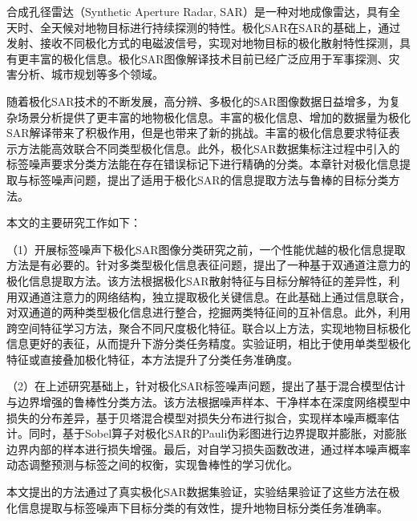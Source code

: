 \begin{chineseabstract}
    合成孔径雷达（Synthetic Aperture Radar, SAR）是一种对地成像雷达，具有全天时、全天候对地物目标进行持续探测的特性。极化SAR在SAR的基础上，通过发射、接收不同极化方式的电磁波信号，实现对地物目标的极化散射特性探测，具有更丰富的极化信息。极化SAR图像解译技术目前已经广泛应用于军事探测、灾害分析、城市规划等多个领域。

    随着极化SAR技术的不断发展，高分辨、多极化的SAR图像数据日益增多，为复杂场景分析提供了更丰富的地物极化信息。丰富的极化信息、增加的数据量为极化SAR解译带来了积极作用，但是也带来了新的挑战。丰富的极化信息要求特征表示方法能高效联合不同类型极化信息。此外，极化SAR数据集标注过程中引入的标签噪声要求分类方法能在存在错误标记下进行精确的分类。本章针对极化信息提取与标签噪声问题，提出了适用于极化SAR的信息提取方法与鲁棒的目标分类方法。

    本文的主要研究工作如下：

    （1）开展标签噪声下极化SAR图像分类研究之前，一个性能优越的极化信息提取方法是有必要的。针对多类型极化信息表征问题，提出了一种基于双通道注意力的极化信息提取方法。该方法根据极化SAR散射特征与目标分解特征的差异性，利用双通道注意力的网络结构，独立提取极化关键信息。在此基础上通过信息联合，对双通道的两种类型极化信息进行整合，挖掘两类特征间的互补信息。此外，利用跨空间特征学习方法，聚合不同尺度极化特征。联合以上方法，实现地物目标极化信息更好的表征，从而提升下游分类任务精度。实验证明，相比于使用单类型极化特征或直接叠加极化特征，本方法提升了分类任务准确度。

    （2）在上述研究基础上，针对极化SAR标签噪声问题，提出了基于混合模型估计与边界增强的鲁棒性分类方法。该方法根据噪声样本、干净样本在深度网络模型中损失的分布差异，基于贝塔混合模型对损失分布进行拟合，实现样本噪声概率估计。同时，基于Sobel算子对极化SAR的Pauli伪彩图进行边界提取并膨胀，对膨胀边界内部的样本进行损失增强。最后，对自学习损失函数改进，通过样本噪声概率动态调整预测与标签之间的权衡，实现鲁棒性的学习优化。

    本文提出的方法通过了真实极化SAR数据集验证，实验结果验证了这些方法在极化信息提取与标签噪声下目标分类的有效性，提升地物目标分类任务准确率。





\end{chineseabstract}

